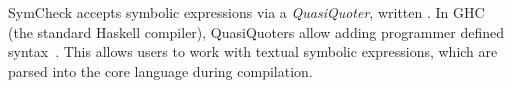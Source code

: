 SymCheck accepts symbolic expressions via a \textit{QuasiQuoter},
written . 
In GHC (the standard Haskell compiler), QuasiQuoters allow adding programmer defined syntax~\cite{mainland2007s}.
This allows users to work with textual symbolic expressions,
which are parsed into the core language during compilation.
